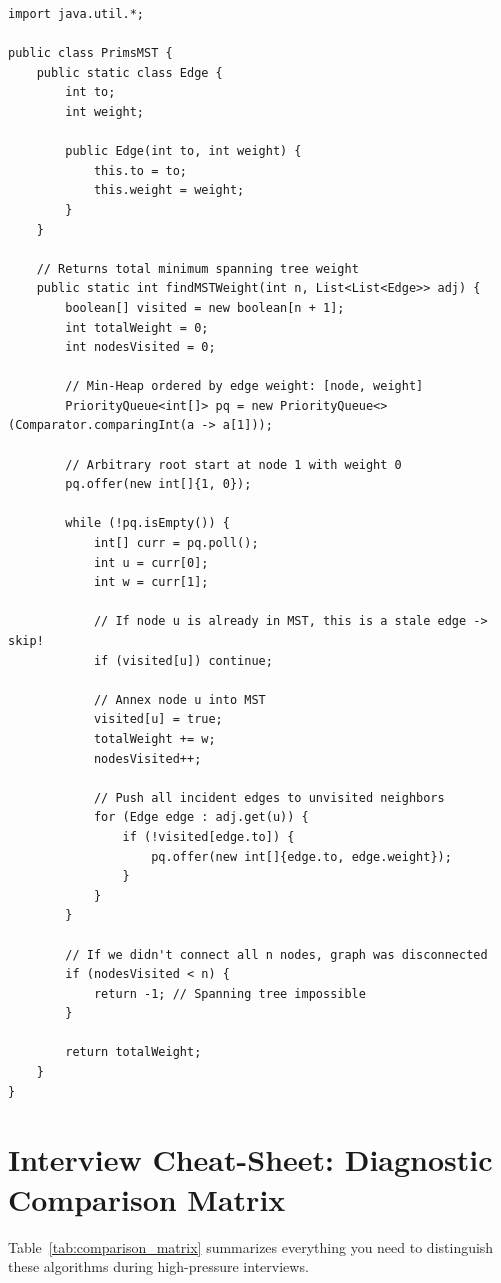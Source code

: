 \documentclass[10pt,journal,compsoc,onecolumn]{IEEEtran}
\begin{document}
\begin{verbatim}
import java.util.*;

public class PrimsMST {
    public static class Edge {
        int to;
        int weight;

        public Edge(int to, int weight) {
            this.to = to;
            this.weight = weight;
        }
    }

    // Returns total minimum spanning tree weight
    public static int findMSTWeight(int n, List<List<Edge>> adj) {
        boolean[] visited = new boolean[n + 1];
        int totalWeight = 0;
        int nodesVisited = 0;

        // Min-Heap ordered by edge weight: [node, weight]
        PriorityQueue<int[]> pq = new PriorityQueue<>(Comparator.comparingInt(a -> a[1]));

        // Arbitrary root start at node 1 with weight 0
        pq.offer(new int[]{1, 0});

        while (!pq.isEmpty()) {
            int[] curr = pq.poll();
            int u = curr[0];
            int w = curr[1];

            // If node u is already in MST, this is a stale edge -> skip!
            if (visited[u]) continue;

            // Annex node u into MST
            visited[u] = true;
            totalWeight += w;
            nodesVisited++;

            // Push all incident edges to unvisited neighbors
            for (Edge edge : adj.get(u)) {
                if (!visited[edge.to]) {
                    pq.offer(new int[]{edge.to, edge.weight});
                }
            }
        }

        // If we didn't connect all n nodes, graph was disconnected
        if (nodesVisited < n) {
            return -1; // Spanning tree impossible
        }

        return totalWeight;
    }
}
\end{verbatim}

\section{Interview Cheat-Sheet: Diagnostic Comparison Matrix}
\label{sec:cheat_sheet}

Table~\ref{tab:comparison_matrix} summarizes everything you need to distinguish these algorithms during high-pressure interviews.
\end{document}
